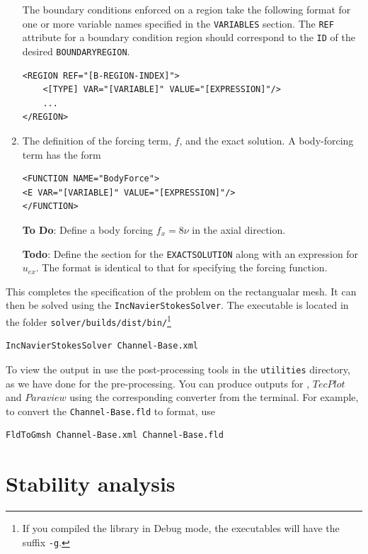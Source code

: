 \documentclass[a4paper,12pt]{article}
\begin{document}
\begin{enumerate}
The boundary conditions enforced on a region take the following format for one
or more variable names specified in the \texttt{VARIABLES} section. The
\texttt{REF} attribute for a boundary condition region should correspond to the
\texttt{ID} of the desired \texttt{BOUNDARYREGION}.
\begin{verbatim}
<REGION REF="[B-REGION-INDEX]">
    <[TYPE] VAR="[VARIABLE]" VALUE="[EXPRESSION]"/>
    ...
</REGION>
\end{verbatim}

\item The definition of the forcing term, $f$, and the exact solution. A body-forcing
term has the form
\begin{verbatim}
<FUNCTION NAME="BodyForce">
<E VAR="[VARIABLE]" VALUE="[EXPRESSION]"/>
</FUNCTION>
\end{verbatim}

\textbf{To Do}: Define a body forcing  $f_x=8\nu$ in the axial direction.

\textbf{Todo}: Define the section for the \texttt{EXACTSOLUTION} along with an
expression for $u_{ex}$. The format is identical to that for specifying the
forcing function.
\end{enumerate}

This completes the specification of the problem on the rectangualar mesh.
It can then be solved using the \texttt{IncNavierStokesSolver}.
 The executable is located in the folder
\texttt{solver/builds/dist/bin/}\footnote{If you compiled the library in Debug
mode, the executables will have the suffix \texttt{-g}.}

\begin{verbatim}
IncNavierStokesSolver Channel-Base.xml
\end{verbatim}

To view the output in \gmsh use the post-processing
tools in the \texttt{utilities} directory, as we have done for the
pre-processing. You can produce outputs for \gmsh, $TecPlot$ and $Paraview$
using the corresponding converter from the terminal. For example, to convert the
\texttt{Channel-Base.fld} to \gmsh format, use

\begin{verbatim}
FldToGmsh Channel-Base.xml Channel-Base.fld
\end{verbatim} 


\clearpage
\section{Stability analysis}
\end{document}
